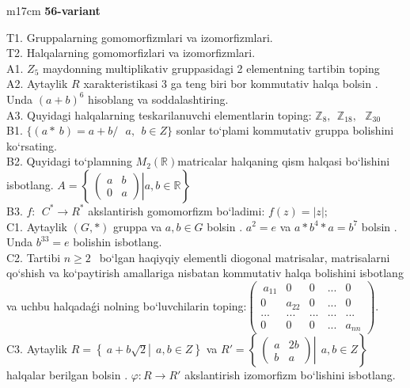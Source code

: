 \documentclass{article}
\begin{document}
\begin{tabular}{m{17cm}}
\textbf{56-variant}
\newline

T1. Gruppalarning gomomorfizmlari va izomorfizmlari. \\
T2. Halqalarning gomomorfizlari va izomorfizmlari. \\
A1. \(Z_{5}\) maydonning multiplikativ gruppasidagi 2 elementning tartibin toping \\
A2. Aytaylik \(R\) xarakteristikasi 3 ga teng biri bor kommutativ halqa bo\textquotesingle lsin . Unda \((a + b)^{6}\) hisoblang va soddalashtiring. \\
A3. Quyidagi halqalarning teskarilanuvchi elementlarin toping: \(\mathbb{Z}_{8},\ \ \mathbb{Z}_{18},\ \ \ \mathbb{Z}_{30}\) \\
B1. \(\{(a*\ b) = a + b/\ \ \ a,\ \ b \in Z\}\) sonlar to`plami kommutativ gruppa bolishini ko`rsating. \\
B2. Quyidagi to`plamning \(M_{2}(\mathbb{R})\)matricalar halqaning qism halqasi bo`lishini isbotlang. \(A = \left\{ \left. \ \begin{pmatrix}
a & b \\
0 & a
\end{pmatrix} \right|a,b\mathbb{\in R} \right\}\) \\
B3. \(f:\ \ C^{*} \rightarrow R^{*}\) akslantirish gomomorfizm bo`ladimi: \(f(z) = |z|;\) \\
C1. Aytaylik \((G,*)\) gruppa va \(a,b \in G\) bo\textquotesingle lsin . \(a^{2} = e\) va \(a*b^{4}*a = b^{7}\) bo\textquotesingle lsin . Unda \(b^{33} = e\) bolishin isbotlang. \\
C2. Tartibi \(n \geq 2\ \ \) bo`lgan haqiyqiy elementli diogonal matrisalar, matrisalarni qo`shish va ko`paytirish amallariga nisbatan kommutativ halqa bolishini isbotlang va uchbu halqadaǵi nolning bo`luvchilarin toping:\(\begin{pmatrix}
\ a_{11} & 0\ \  & 0 & ... & 0\ \  \\
0\ \  & a_{22} & 0 & ... & 0\ \  \\
... & ... & ... & ... & ... \\
0\ \  & 0\ \  & 0 & ... & a_{nn}
\end{pmatrix}.\) \\
C3. Aytaylik \(R = \left\{ \left. \ a + b\sqrt{2} \right|\ \ a,b \in Z \right\}\) va \(R' = \left\{ \left. \ \begin{pmatrix}
a & 2b \\
b & a
\end{pmatrix} \right|\ \ a,b \in Z \right\}\) halqalar berilgan bo\textquotesingle lsin . \(\varphi:R \rightarrow R'\) akslantirish izomorfizm bo`lishini isbotlang. \\

\end{tabular}
\vspace{1cm}
\end{document}
